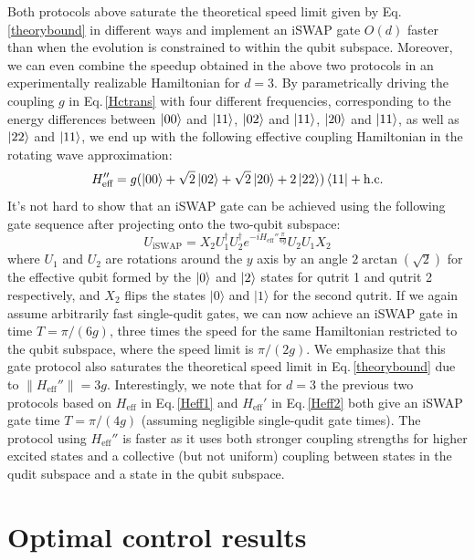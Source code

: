 \documentclass[twocolumn,english,pra,superscriptaddress]{revtex4-1}
\begin{document}
Both protocols above saturate the theoretical speed limit given by Eq.\,\eqref{theorybound} in different ways and implement an iSWAP gate $O(d)$ faster than when the evolution is constrained to within the qubit subspace. Moreover, we can even combine the speedup obtained in the above two protocols in an experimentally realizable Hamiltonian for $d=3$. By parametrically driving the coupling $g$ in Eq.\,\eqref{Hctrans} with four different frequencies, corresponding to the energy differences between $\ket{00}$ and $\ket{11}$, $\ket{02}$ and $\ket{11}$, $\ket{20}$ and $\ket{11}$, as well as $\ket{22}$ and $\ket{11}$, we end up with the following effective coupling Hamiltonian in the rotating wave approximation:
\begin{equation}\label{Heff3}
     H_{\text{eff}}'' = g (\ket{00} + \sqrt{2} \ket{02} + \sqrt{2} \ket{20} + 2 \ket{22}) \bra{11} + \text{h.c.}
\end{equation}
It's not hard to show that an iSWAP gate can be achieved using the following gate sequence after projecting onto the two-qubit subspace:
\begin{equation}\label{Uprotocol}
    U_{\text{iSWAP}} = X_2 U_1^\dagger U_2^\dagger e^{-i H_{\text{eff}}'' \frac{\pi}{6g}} U_2 U_1X_2
\end{equation}
where $U_1$ and $U_2$ are rotations around the $y$ axis by an angle $2\arctan(\sqrt{2})$ for the effective qubit formed by the $\ket{0}$ and $\ket{2}$ states for qutrit 1 and qutrit 2 respectively, and $X_2$ flips the states $|0\rangle$ and $|1\rangle$ for the second qutrit. If we again assume arbitrarily fast single-qudit gates, we can now achieve an iSWAP gate in time $T= \pi/(6g)$, three times the speed for the same Hamiltonian restricted to the qubit subspace, where the speed limit is $\pi/(2g).$ We emphasize that this gate protocol also saturates the theoretical speed limit in Eq.\,\eqref{theorybound} due to $\lVert H_{\text{eff}}''\rVert = 3g$. Interestingly, we note that for $d=3$ the previous two protocols based on $H_{\text{eff}}$ in Eq.\,\eqref{Heff1} and $H_{\text{eff}}'$ in Eq.\,\eqref{Heff2} both give an iSWAP gate time $T = \pi/(4g)$ (assuming negligible single-qudit gate times). The protocol using $H_{\text{eff}}''$ is faster as it uses both stronger coupling strengths for higher excited states and a collective (but not uniform) coupling between states in the qudit subspace and a state in the qubit subspace.

\section{Optimal control results} \vspace{-5pt}
\end{document}
